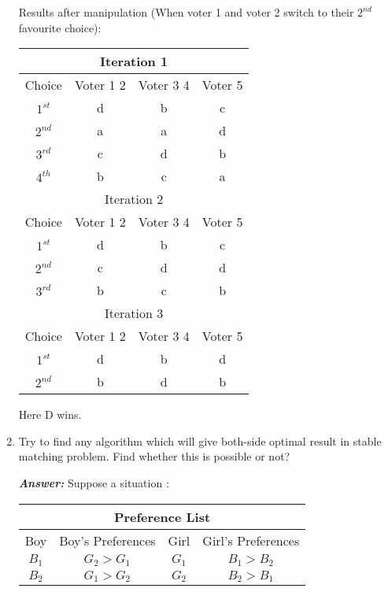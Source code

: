 \documentclass[15pt]{article}
\begin{document}
\begin{enumerate}
Results after manipulation (When voter 1 and voter 2 switch to their $2^{nd}$ favourite choice):
\begin{center}
\begin{tabular}{ |c|c|c|c| } 
 \hline
 \multicolumn{4}{|c|}{Iteration 1} \\ 
 \hline
 Choice & Voter 1 2 & Voter 3 4 & Voter 5  \\ [0.5ex] 
 \hline
 $1^{st}$ & d & b & c \\ 
 \hline
 $2^{nd}$ & a & a & d \\ 
 \hline
 $3^{rd}$ & c & d & b \\ 
 \hline
 $4^{th}$ & b & c & a \\
 \hline
 \multicolumn{4}{|c|}{Iteration 2} \\ 
 \hline
 Choice & Voter 1 2 & Voter 3 4 & Voter 5  \\ [0.5ex] 
 \hline
 $1^{st}$ & d & b & c \\ 
 \hline
 $2^{nd}$ & c & d & d \\ 
 \hline
 $3^{rd}$ & b & c & b \\
 \hline
 \multicolumn{4}{|c|}{Iteration 3} \\ 
 \hline
 Choice & Voter 1 2 & Voter 3 4 & Voter 5  \\ [0.5ex] 
 \hline
 $1^{st}$ & d & b & d \\ 
 \hline
 $2^{nd}$ & b & d & b \\ [1ex] 
 \hline
\end{tabular}
\end{center}
Here D wins.

\item Try to find any algorithm which will give both-side optimal result in stable matching problem. Find whether this is possible or not?

\textbf{\emph{Answer: }} Suppose a situation :

\begin{center}
\begin{tabular}{ |c|c|c|c| } 
 \hline
 \multicolumn{4}{|c|}{Preference List} \\ 
 \hline
 Boy & Boy's Preferences & Girl & Girl's Preferences  \\ [0.5ex] 
 \hline
 $B_1$ & $G_2>G_1$ & $G_1$ & $B_1>B_2$ \\ 
 \hline
 $B_2$ & $G_1>G_2$ & $G_2$ & $B_2>B_1$ \\ [1ex] 
 \hline
\end{tabular}
\end{center}


\end{enumerate}
\end{document}
